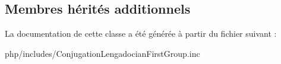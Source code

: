 \subsection*{Membres hérités additionnels}


La documentation de cette classe a été générée à partir du fichier suivant \+:\begin{DoxyCompactItemize}
\item 
php/includes/Conjugation\+Lengadocian\+First\+Group.\+inc\end{DoxyCompactItemize}
